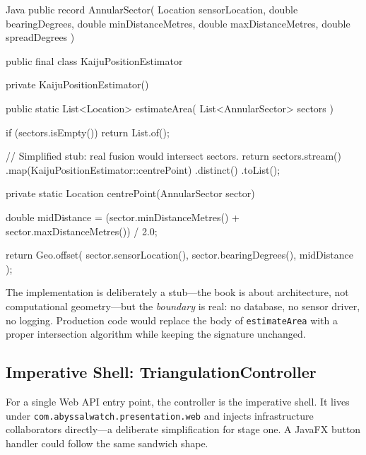 \begin{ridercode}{Java}
public record AnnularSector(
    Location sensorLocation,
    double bearingDegrees,
    double minDistanceMetres,
    double maxDistanceMetres,
    double spreadDegrees
)
{
}

public final class KaijuPositionEstimator
{
    private KaijuPositionEstimator()
    {
    }

    public static List<Location> estimateArea(
        List<AnnularSector> sectors
    )
    {
        if (sectors.isEmpty())
        {
            return List.of();
        }

        // Simplified stub: real fusion would intersect sectors.
        return sectors.stream()
            .map(KaijuPositionEstimator::centrePoint)
            .distinct()
            .toList();
    }

    private static Location centrePoint(AnnularSector sector)
    {
        double midDistance =
            (sector.minDistanceMetres()
                + sector.maxDistanceMetres()) / 2.0;

        return Geo.offset(
            sector.sensorLocation(),
            sector.bearingDegrees(),
            midDistance
        );
    }
}
\end{ridercode}
\label{lst:fcis-kaiju-position-estimator}

The implementation is deliberately a stub---the book is about architecture, not computational geometry---but the \textit{boundary} is real: no database, no sensor driver, no logging. Production code would replace the body of \texttt{estimateArea} with a proper intersection algorithm while keeping the signature unchanged.

\subsection{Imperative Shell: TriangulationController}
\label{sec:fcis_triangulation_shell}

For a single Web API entry point, the controller is the imperative shell. It lives under \texttt{com.abyssalwatch.presentation.web} and injects infrastructure collaborators directly---a deliberate simplification for stage one. A JavaFX button handler could follow the same sandwich shape.

